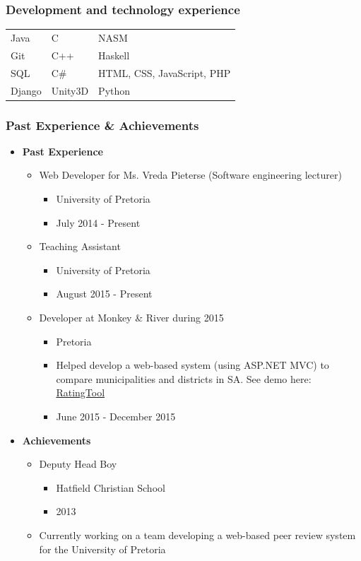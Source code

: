 \documentclass{article}
\begin{document}
\subsubsection{Development and technology experience}
			\begin{tabular}{| l | l | l |}
				Java   & C		& NASM                        \\
				Git    & C++      & Haskell                     \\
				SQL    & C\#	& HTML, CSS, JavaScript, PHP   \\
				Django & Unity3D	& Python	
			\end{tabular}
		
\subsubsection{Past Experience \& Achievements}
			\begin{itemize}
				\item \textbf{Past Experience}
				\begin{itemize}
					\item Web Developer for Ms. Vreda Pieterse (Software engineering lecturer)
					\begin{itemize}
						\item University of Pretoria
						\item July 2014 - Present
					\end{itemize}
					\item Teaching Assistant
					\begin{itemize}
						\item University of Pretoria
						\item August 2015 - Present
					\end{itemize}
					\item Developer at Monkey \& River during 2015
					\begin{itemize}
						\item Pretoria
						\item Helped develop a web-based system (using ASP.NET MVC) to compare municipalities and districts in SA. See demo here: \href{http://salgabarometerdemo.org.za/RatingTool}{RatingTool}
						\item June 2015 - December 2015
					\end{itemize}
				\end{itemize}
				
				\item \textbf{Achievements}
				\begin{itemize}
					\item Deputy Head Boy
					\begin{itemize}
						\item Hatfield Christian School
						\item 2013
					\end{itemize}
					\item Currently working on a team developing a web-based peer review system for the University of Pretoria
				\end{itemize}
			\end{itemize}
\end{document}

